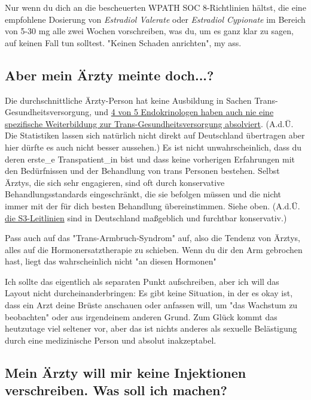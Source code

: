 \documentclass{article}
\begin{document}
Nur wenn du dich an die bescheuerten WPATH SOC 8-Richtlinien hältst, die eine empfohlene Dosierung von \textit{Estradiol Valerate} oder \textit{Estradiol Cypionate} im Bereich von 5-30 mg alle zwei Wochen vorschreiben, was du, um es ganz klar zu sagen, auf keinen Fall tun solltest. "Keinen Schaden anrichten", my ass.

\subsection{Aber mein Ärzty meinte doch...?}

Die durchschnittliche Ärzty-Person hat keine Ausbildung in Sachen Trans-Gesundheitsversorgung, und \href{https://www.endocrine.org/news-and-advocacy/news-room/2017/endocrinologists-want-training-in-transgender-care }{4 von 5 Endokrinologen haben auch nie eine spezifische Weiterbildung zur Trans-Gesundheitsversorgung absolviert}. (A.d.Ü. Die Statistiken lassen sich natürlich nicht direkt auf Deutschland übertragen aber hier dürfte es auch nicht besser aussehen.) Es ist nicht unwahrscheinlich, dass du deren erste\_e Transpatient\_in bist und dass keine vorherigen Erfahrungen mit den Bedürfnissen und der Behandlung von trans Personen bestehen. Selbst Ärztys, die sich sehr engagieren, sind oft durch konservative Behandlungsstandards eingeschränkt, die sie befolgen müssen und die nicht immer mit der für dich besten Behandlung übereinstimmen. Siehe oben. (A.d.Ü. \href{https://schwulenberatungberlin.de/wp-content/uploads/2025/06/AWMF-online_S3_Richtlinie.pdf}{die S3-Leitlinien} sind in Deutschland maßgeblich und furchtbar konservativ.)

Pass auch auf das "Trans-Armbruch-Syndrom" auf, also die Tendenz von Ärztys, alles auf die Hormonersatztherapie zu schieben. Wenn du dir den Arm gebrochen hast, liegt das wahrscheinlich nicht "an diesen Hormonen"

Ich sollte das eigentlich als separaten Punkt aufschreiben, aber ich will das Layout nicht durcheinanderbringen: Es gibt keine Situation, in der es okay ist, dass ein Arzt deine Brüste anschauen oder anfassen will, um "das Wachstum zu beobachten" oder aus irgendeinem anderen Grund. Zum Glück kommt das heutzutage viel seltener vor, aber das ist nichts anderes als sexuelle Belästigung durch eine medizinische Person und absolut inakzeptabel.

\subsection{Mein Ärzty will mir keine Injektionen verschreiben. Was soll ich machen?}
\end{document}
